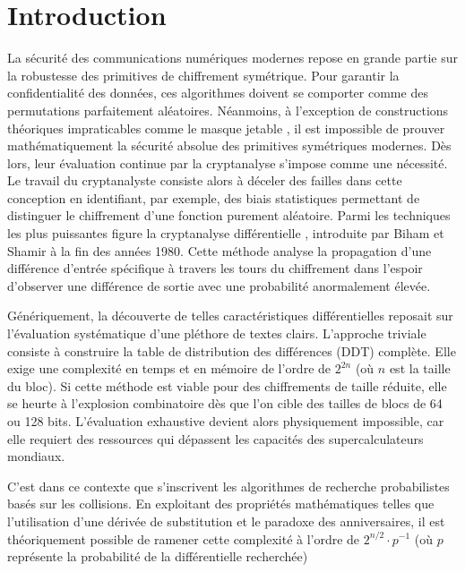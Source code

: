 \documentclass[a4paper,11pt]{article}
\begin{document}
\clearpage
\thispagestyle{empty}
\phantom{.}
\clearpage

\tableofcontents
\newpage

\section{Introduction}

La sécurité des communications numériques modernes repose en grande partie sur la robustesse des primitives de chiffrement symétrique. Pour garantir la confidentialité des données, ces algorithmes doivent se comporter comme des permutations parfaitement aléatoires. Néanmoins, à l'exception de constructions théoriques impraticables comme le masque jetable \cite{KL14}, il est impossible de prouver mathématiquement la sécurité absolue des primitives symétriques modernes. Dès lors, leur évaluation continue par la cryptanalyse s'impose comme une nécessité. Le travail du cryptanalyste consiste alors à déceler des failles dans cette conception en identifiant, par exemple, des biais statistiques permettant de distinguer le chiffrement d'une fonction purement aléatoire. Parmi les techniques les plus puissantes figure la cryptanalyse différentielle \cite{BS91}, introduite par Biham et Shamir à la fin des années 1980. Cette méthode analyse la propagation d'une différence d'entrée spécifique à travers les tours du chiffrement dans l'espoir d'observer une différence de sortie avec une probabilité anormalement élevée.

Génériquement, la découverte de telles caractéristiques différentielles reposait sur l'évaluation systématique d'une pléthore de textes clairs. L'approche triviale consiste à construire la table de distribution des différences (DDT) complète. Elle exige une complexité en temps et en mémoire de l'ordre de $2^{2n}$ (où $n$ est la taille du bloc). Si cette méthode est viable pour des chiffrements de taille réduite, elle se heurte à l'explosion combinatoire dès que l'on cible des tailles de blocs de 64 ou 128 bits. L'évaluation exhaustive devient alors physiquement impossible, car elle requiert des ressources qui dépassent les capacités des supercalculateurs mondiaux.

C'est dans ce contexte que s'inscrivent les algorithmes de recherche probabilistes basés sur les collisions. En exploitant des propriétés mathématiques telles que l'utilisation d'une dérivée de substitution et le paradoxe des anniversaires, il est théoriquement possible de ramener cette complexité à l'ordre de $2^{n/2} \cdot p^{-1}$ (où $p$ représente la probabilité de la différentielle recherchée)
\end{document}
